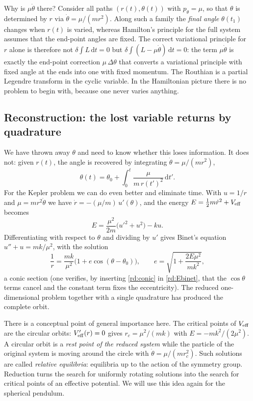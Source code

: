 Why is $\mu\dot\theta$ there? Consider all paths $(r(t),\theta(t))$ with $p_\theta=\mu$, so that $\theta$ is determined by $r$ via $\dot\theta=\mu/(mr^2)$. Along such a family the \emph{final angle} $\theta(t_1)$ changes when $r(t)$ is varied, whereas Hamilton's principle for the full system assumes that the end-point angles are fixed. The correct variational principle for $r$ alone is therefore not $\delta\int L\,\mathrm dt=0$ but $\delta\int(L-\mu\dot\theta)\,\mathrm dt=0$: the term $\mu\dot\theta$ is exactly the end-point correction $\mu\,\Delta\theta$ that converts a variational principle with fixed angle at the ends into one with fixed momentum. The Routhian is a partial Legendre transform in the cyclic variable. In the Hamiltonian picture there is no problem to begin with, because one never varies anything.

\subsection{Reconstruction: the lost variable returns by quadrature}\label{rd:sec:recon}

We have thrown away $\theta$ and need to know whether this loses information. It does not: given $r(t)$, the angle is recovered by integrating $\dot\theta=\mu/(mr^2)$, \[\theta(t)=\theta_0+\int_0^t\frac{\mu}{m\,r(t')^2}\,\mathrm dt'.\] For the Kepler problem we can do even better and eliminate time. With $u=1/r$ and $\mu=mr^2\dot\theta$ we have $\dot r=-(\mu/m)\,u'(\theta)$, and the energy $E=\tfrac12m\dot r^2+V_{\rm eff}$ becomes
\begin{equation}\label{rd:Ebinet}
E=\frac{\mu^2}{2m}\big(u'^2+u^2\big)-ku .
\end{equation}
Differentiating with respect to $\theta$ and dividing by $u'$ gives Binet's equation $u''+u=mk/\mu^2$, with the solution
\begin{equation}\label{rd:conic}
\frac1r=\frac{mk}{\mu^2}\Big(1+e\cos(\theta-\theta_0)\Big),\qquad
e=\sqrt{1+\frac{2E\mu^2}{mk^2}},
\end{equation}
a conic section (one verifies, by inserting \eqref{rd:conic} in \eqref{rd:Ebinet}, that the $\cos\theta$ terms cancel and the constant term fixes the eccentricity). The reduced one-dimensional problem together with a single quadrature has produced the complete orbit.

There is a conceptual point of general importance here. The critical points of $V_{\rm eff}$ are the circular orbits: $V_{\rm eff}'(r)=0$ gives $r_c=\mu^2/(mk)$ with $E=-mk^2/(2\mu^2)$. A circular orbit is a \emph{rest point of the reduced system} while the particle of the original system is moving around the circle with $\dot\theta=\mu/(mr_c^2)$. Such solutions are called \emph{relative equilibria}: equilibria up to the action of the symmetry group. Reduction turns the search for uniformly rotating solutions into the search for critical points of an effective potential. We will use this idea again for the spherical pendulum.

